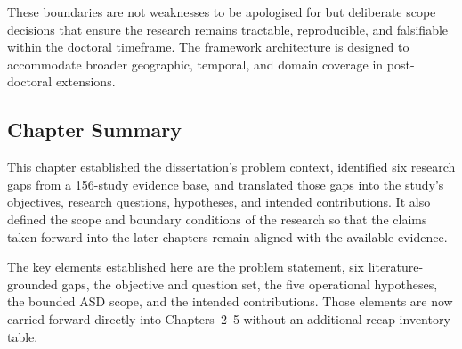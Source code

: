 \noindent These boundaries are not weaknesses to be apologised for but deliberate scope decisions that ensure the research remains tractable, reproducible, and falsifiable within the doctoral timeframe. The framework architecture is designed to accommodate broader geographic, temporal, and domain coverage in post-doctoral extensions.

\subsection{Chapter Summary}
\label{sec:ch1_conclusion}

This chapter established the dissertation's problem context, identified six research gaps from a 156-study evidence base, and translated those gaps into the study's objectives, research questions, hypotheses, and intended contributions. It also defined the scope and boundary conditions of the research so that the claims taken forward into the later chapters remain aligned with the available evidence.

%


The key elements established here are the problem statement, six literature-grounded gaps, the objective and question set, the five operational hypotheses, the bounded ASD scope, and the intended contributions. Those elements are now carried forward directly into Chapters~2--5 without an additional recap inventory table.

